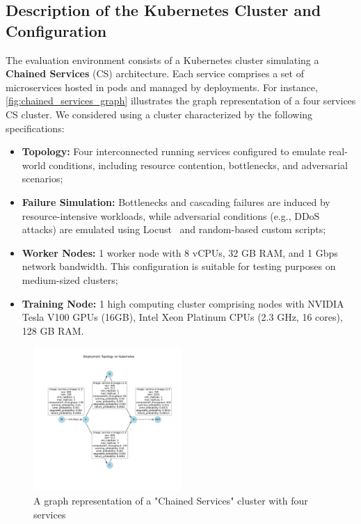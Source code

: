 \documentclass[conference]{IEEEtran}
\begin{document}
\subsection{Description of the Kubernetes Cluster and Configuration}

The evaluation environment consists of a Kubernetes cluster simulating a \textbf{Chained Services} (CS) architecture. Each service comprises a set of microservices hosted in pods and managed by deployments. For instance, \autoref{fig:chained_services_graph} illustrates the graph representation of a four services CS cluster. We considered using a cluster characterized by the following specifications:

\begin{itemize}
    \item \textbf{Topology:} Four interconnected running services configured to emulate real-world conditions, including resource contention, bottlenecks, and adversarial scenarios;
    \item \textbf{Failure Simulation:} Bottlenecks and cascading failures are induced by resource-intensive workloads, while adversarial conditions (e.g., DDoS attacks) are emulated using Locust~\cite{locust2021} and random-based custom scripts;
    \item \textbf{Worker Nodes:} 1 worker node with 8 vCPUs, 32 GB RAM, and 1 Gbps network bandwidth. This configuration is suitable for testing purposes on medium-sized clusters;
    \item \textbf{Training Node:} 1 high computing cluster comprising nodes with NVIDIA Tesla V100 GPUs (16GB), Intel Xeon Platinum CPUs (2.3 GHz, 16 cores), 128 GB RAM.
\end{itemize}

\begin{figure}[h!]
    \centering
    \hspace{-0.4cm}
    \includegraphics[trim=1.8cm 3.3cm 1.25cm 3.5cm, clip, width=0.5\textwidth]{figures/k8s_cluster_graph.pdf}
    \caption{A graph representation of a "Chained Services" cluster with four services}
    \label{fig:chained_services_graph}
\end{figure}
\end{document}
